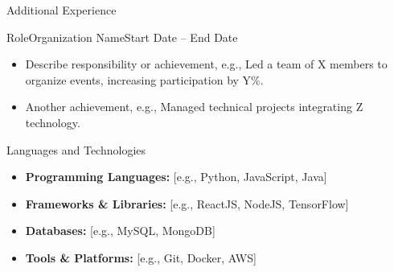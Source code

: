 \documentclass[]{mcdowellcv_3}%
\begin{document}
\begin{cvsection}{Additional Experience}
    \begin{cvsubsection}{Role}{Organization Name}{Start Date -- End Date}
        \begin{itemize}
            \item Describe responsibility or achievement, e.g., Led a team of X members to organize events, increasing participation by Y\%.
            \item Another achievement, e.g., Managed technical projects integrating Z technology.
        \end{itemize}
    \end{cvsubsection}
\end{cvsection}

\begin{cvsection}{Languages and Technologies}
    \begin{cvsubsection}{}{}{}
        \begin{itemize}
            \item \textbf{Programming Languages:} [e.g., Python, JavaScript, Java]
            \item \textbf{Frameworks \& Libraries:} [e.g., ReactJS, NodeJS, TensorFlow]
            \item \textbf{Databases:} [e.g., MySQL, MongoDB]
            \item \textbf{Tools \& Platforms:} [e.g., Git, Docker, AWS]
        \end{itemize}
    \end{cvsubsection}
\end{cvsection}
\end{document}
